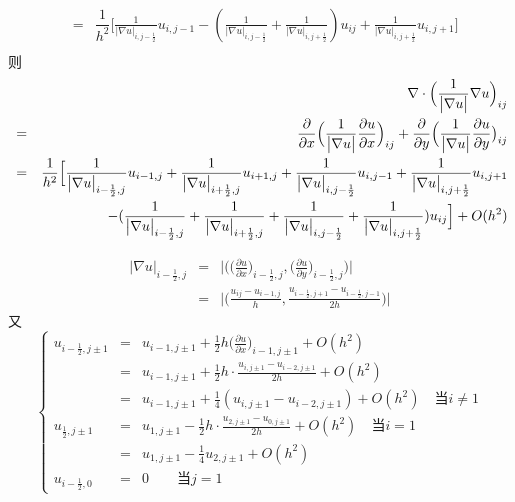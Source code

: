 \documentclass[a4paper,left=2.5cm,right=2.5cm]{article}
\begin{document}
\begin{spacing}{1.6}
$$\begin{eqnarray}
		&=&\dfrac{1}{h^2}\Big[\frac{1}{\big|\nabla u\big|_{i,j-\frac{1}{2}}}u_{i,j-1}-(\frac{1}{\big|\nabla u\big|_{i,j-\frac{1}{2}}}+\frac{1}{\big|\nabla u\big|_{i,j+\frac{1}{2}}})u_{ij}+\frac{1}{\big|\nabla u\big|_{i,j+\frac{1}{2}}}u_{i,j+1}\big]\\
		\end{eqnarray}
		则
		\begin{eqnarray}
		&&\nabla\cdot\Big(\frac{1}{\big|\nabla u\big|}\nabla u\Big)_{ij}\\
		&=&\dfrac{\partial}{\partial x}\Big(\dfrac{1}{\big|\nabla u\big|}\frac{\partial u}{\partial x}\Big)_{ij} + \frac{\partial}{\partial y}\Big(\frac{1}{\big|\nabla u\big|}\frac{\partial u}{\partial y}\big)_{ij} \\
		&=&\dfrac{1}{h^2}\Big[\frac{1}{\big|\nabla u\big|_{i-\frac{1}{2},j}}u_{i-1,j}+\frac{1}{\big|\nabla u\big|_{i+\frac{1}{2},j}}u_{i+1,j}+
		\frac{1}{\big|\nabla u\big|_{i,j-\frac{1}{2}}}u_{i,j-1}+
		\frac{1}{\big|\nabla u\big|_{i,j+\frac{1}{2}}}u_{i,j+1}\notag \\
		&&-
		(\frac{1}{\big|\nabla u\big|_{i-\frac{1}{2},j}}+\frac{1}{\big|\nabla u\big|_{i+\frac{1}{2},j}}+\frac{1}{\big|\nabla u\big|_{i,j-\frac{1}{2}}}+
		\frac{1}{\big|\nabla u\big|_{i,j+\frac{1}{2}}})u_{ij}
		\Big] + O(h^2)
		\end{eqnarray}
		
		\begin{eqnarray}
		\big|\nabla u\big|_{i-\frac{1}{2},j}
		&=&\Big|\Big(\big(\frac{\partial u}{\partial x}\big)_{i-\frac{1}{2},j},\big(\frac{\partial u}{\partial y}\big)_{i-\frac{1}{2},j}\Big)\Big|\\
		&=&\Big|\Big(\frac{u_{ij}-u_{i-1,j}}{h},\frac{u_{i-\frac{1}{2},j+1}-u_{i-\frac{1}{2},j-1}}{2h}\Big)\Big|
		\end{eqnarray}
		又
		\begin{equation}
		\left\{
		\begin{array}{lll}
		u_{i-\frac{1}{2},j\pm1} & =& u_{i-1,j\pm1}+\frac{1}{2}h\big(\frac{\partial u}{\partial x}\big)_{i-1,j\pm1}+O(h^2)\\
		& = & u_{i-1,j\pm1} + \frac{1}{2}h\cdot\frac{u_{i,j\pm1}-u_{i-2,j\pm1}}{2h} + O(h^2)\\
		& = & u_{i-1,j\pm1} + \frac{1}{4}(u_{i,j\pm1}-u_{i-2,j\pm1}) + O(h^2)\quad\text{当}i\neq 1\\
			u_{\frac{1}{2},j\pm1} &=& u_{1,j\pm1}-\frac{1}{2}h\cdot\frac{u_{2,j\pm1}-u_{0,j\pm1}}{2h}+O(h^2)\quad\text{当}i= 1\\
			&=&u_{1,j\pm1} - \frac{1}{4}u_{2,j\pm1}+O(h^2)\\
			u_{i-\frac{1}{2},0} &=& 0\qquad \text{当}j = 1
		\end{array}
		\right.
		\end{equation}
	

\end{spacing}
\end{document}
